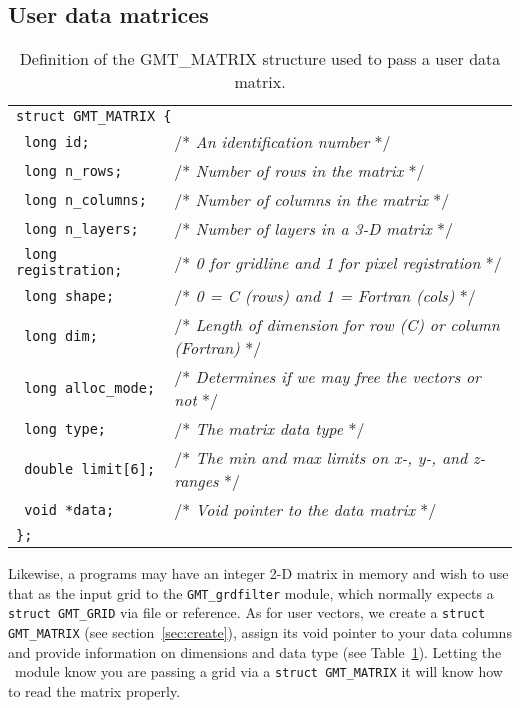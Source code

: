\documentclass{report}
\begin{document}
\subsection{User data matrices}

\begin{table}[h]
\small
\centering
\begin{tabular}{ll} \hline
\multicolumn{2}{l}{\texttt{struct GMT\_MATRIX \{}} \\ 
\texttt{	long id;}		&       /* \emph{An identification number} */ \\
\texttt{	long n\_rows;}		&       /* \emph{Number of rows in the matrix} */ \\
\texttt{	long n\_columns;}	&       /* \emph{Number of columns in the matrix}  */\\
\texttt{	long n\_layers;}	&       /* \emph{Number of layers in a 3-D matrix}  */\\
\texttt{	long registration;}	&       /* \emph{0 for gridline and 1 for pixel registration}  */\\
\texttt{	long shape;}		&       /* \emph{0 = C (rows) and 1 = Fortran (cols)}  */\\
\texttt{	long dim;}		&       /* \emph{Length of dimension for row (C) or column (Fortran)}  */\\
\texttt{	long alloc\_mode;}	&       /* \emph{Determines if we may free the vectors or not}  */\\
\texttt{	long type;}		&       /* \emph{The matrix data type}  */\\
\texttt{	double limit[6];}	&       /* \emph{The min and max limits on x-, y-, and z-ranges}  */\\
\texttt{	void *data;}		&       /* \emph{Void pointer to the data matrix}  */\\
\texttt{\};}	&        \\  \hline
\end{tabular}
\caption{Definition of the GMT\_MATRIX structure used to pass a user data matrix.}
\label{tbl:matrix}
\end{table}
\noindent
Likewise, a programs may have an integer 2-D matrix in memory 
and wish to use that as the input grid to the \texttt{GMT\_grdfilter} module, which normally
expects a \texttt{struct GMT\_GRID} via file or reference.  As for user vectors, we create a
\texttt{struct GMT\_MATRIX} (see section~\ref{sec:create}), assign its void pointer to your data
columns and provide information on dimensions and data type (see Table~\ref{tbl:matrix}).
Letting the \GMT\ module know you are passing a grid via a
\texttt{struct GMT\_MATRIX} it will know how to read the matrix properly.
\end{document}
